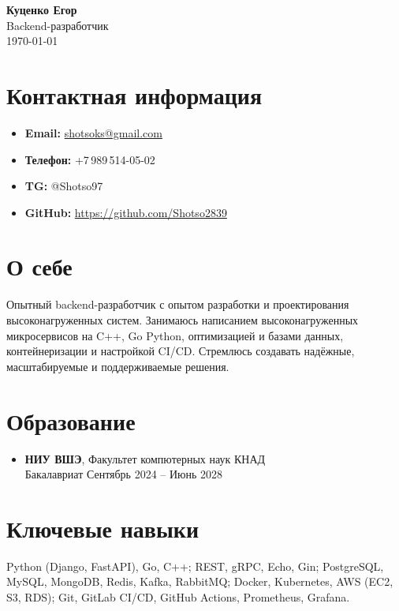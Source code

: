\documentclass[a4paper,11pt]{article}
\begin{document}
\begin{center}
    {\LARGE \textbf{Куценко Егор}}\\
    \vspace{1mm}
    {\normalsize Backend-разработчик}\\
    \vspace{1mm}
    {\small \today}
\end{center}

\vspace{2mm}

\section*{Контактная информация}
\begin{itemize}[leftmargin=*, label={}]
    \item \textbf{Email:} \href{shotsoks@gmail.com}{shotsoks@gmail.com}
    \item \textbf{Телефон:} +7\,989\,514-05-02
    \item \textbf{TG:} @Shotso97
    \item \textbf{GitHub:} \href{https://github.com/Shotso2839}{https://github.com/Shotso2839}
\end{itemize}

\section*{О себе}
Опытный backend-разработчик с опытом разработки и проектирования высоконагруженных систем. Занимаюсь написанием высоконагруженных микросервисов на C++, Go Python, оптимизацией и базами данных, контейнеризации и настройкой CI/CD. Стремлюсь создавать надёжные, масштабируемые и поддерживаемые решения.

\section*{Образование}
\begin{itemize}[leftmargin=*, label={}]
    \item \textbf{НИУ ВШЭ}, Факультет компютерных наук КНАД\\
    Бакалавриат Сентябрь 2024 – Июнь 2028
\end{itemize}

\section*{Ключевые навыки}
Python (Django, FastAPI), Go, C++; REST, gRPC, Echo, Gin; PostgreSQL, MySQL, MongoDB, Redis, Kafka, RabbitMQ; Docker, Kubernetes, AWS (EC2, S3, RDS); Git, GitLab CI/CD, GitHub Actions, Prometheus, Grafana.
\end{document}
